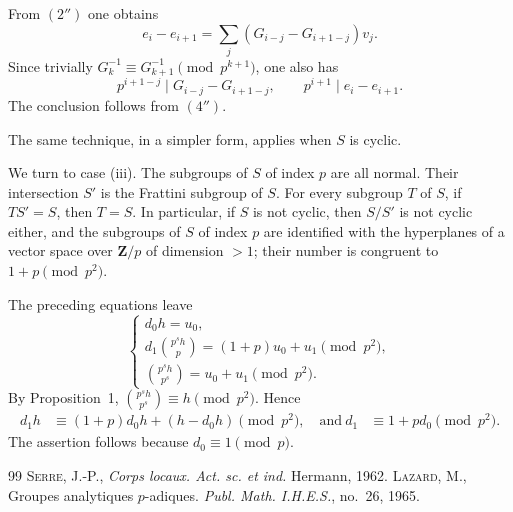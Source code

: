 \documentclass[12pt]{amsart}
\theoremstyle{plain}
\begin{document}
From $(2'')$ one obtains
\[
e_i-e_{i+1}=\sum_j (G_{i-j}-G_{i+1-j})v_j.
\]
Since trivially $G_k^{-1}\equiv G_{k+1}^{-1}\pmod {p^{k+1}}$, one also has
\[
p^{i+1-j}\mid G_{i-j}-G_{i+1-j},\qquad p^{i+1}\mid e_i-e_{i+1}.
\]
The conclusion follows from $(4'')$.

The same technique, in a simpler form, applies when $S$ is cyclic.

We turn to case (iii). The subgroups of $S$ of index $p$ are all normal. Their intersection $S'$ is the Frattini subgroup of $S$. For every subgroup $T$ of $S$, if $TS'=S$, then $T=S$. In particular, if $S$ is not cyclic, then $S/S'$ is not cyclic either, and the subgroups of $S$ of index $p$ are identified with the hyperplanes of a vector space over $\mathbf Z/p$ of dimension $>1$; their number is congruent to $1+p\pmod {p^2}$.

The preceding equations leave
\[
\begin{cases}
d_0 h=u_0,\\[4pt]
d_1\binom{p^s h}{p}=(1+p)u_0+u_1\pmod {p^2},\\[4pt]
\binom{p^s h}{p^s}=u_0+u_1\pmod {p^2}.
\end{cases}
\]
By Proposition~1, $\binom{p^s h}{p^s}\equiv h\pmod {p^2}$. Hence
\begin{align*}
d_1h&\equiv (1+p)d_0h+(h-d_0h)\pmod {p^2},\quad\text{and}\
d_1&\equiv 1+pd_0\pmod {p^2}.
\end{align*}
The assertion follows because $d_0\equiv 1\pmod p$.

\begin{thebibliography}{99}
 \textsc{Serre, J.-P.}, \textit{Corps locaux. Act. sc. et ind.} Hermann, 1962.
\bibitem{Lazard} \textsc{Lazard, M.}, Groupes analytiques $p$-adiques. \textit{Publ. Math. I.H.E.S.}, no.~26, 1965.
\end{thebibliography}
\end{document}
